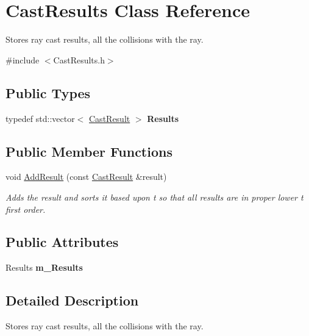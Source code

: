 \hypertarget{classCastResults}{}\section{Cast\+Results Class Reference}
\label{classCastResults}


Stores ray cast results, all the collisions with the ray.  




{\ttfamily \#include $<$Cast\+Results.\+h$>$}

\subsection*{Public Types}
\begin{DoxyCompactItemize}
\item 
\mbox{\label{classCastResults_a96c98918bc6f75030603ae54a470632a}} 
typedef std\+::vector$<$ \hyperlink{classCastResult}{Cast\+Result} $>$ {\bfseries Results}
\end{DoxyCompactItemize}
\subsection*{Public Member Functions}
\begin{DoxyCompactItemize}
\item 
void \hyperlink{classCastResults_a62ee1ac3a8107eb7f8be4d991e9c47c5}{Add\+Result} (const \hyperlink{classCastResult}{Cast\+Result} \&result)
\begin{DoxyCompactList}\small\item\em Adds the result and sorts it based upon t so that all results are in proper lower t first order. \end{DoxyCompactList}\end{DoxyCompactItemize}
\subsection*{Public Attributes}
\begin{DoxyCompactItemize}
\item 
\mbox{\label{classCastResults_acb2777d80f4f46a8fc1954ea9fd7b431}} 
Results {\bfseries m\+\_\+\+Results}
\end{DoxyCompactItemize}


\subsection{Detailed Description}
Stores ray cast results, all the collisions with the ray. 

